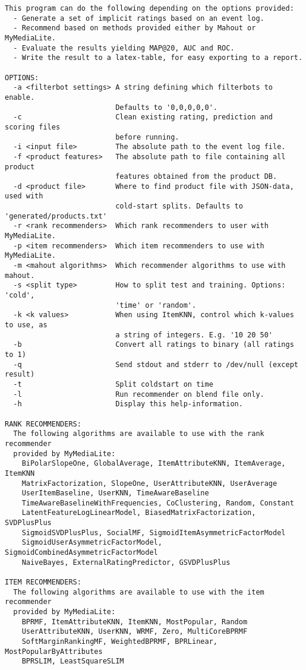 \begin{lstlisting}
This program can do the following depending on the options provided:
  - Generate a set of implicit ratings based on an event log.
  - Recommend based on methods provided either by Mahout or MyMediaLite.
  - Evaluate the results yielding MAP@20, AUC and ROC.
  - Write the result to a latex-table, for easy exporting to a report.

OPTIONS:
  -a <filterbot settings> A string defining which filterbots to enable.
                          Defaults to '0,0,0,0,0'.
  -c                      Clean existing rating, prediction and scoring files
                          before running.
  -i <input file>         The absolute path to the event log file.
  -f <product features>   The absolute path to file containing all product
                          features obtained from the product DB.
  -d <product file>       Where to find product file with JSON-data, used with
                          cold-start splits. Defaults to 'generated/products.txt'
  -r <rank recommenders>  Which rank recommenders to user with MyMediaLite.
  -p <item recommenders>  Which item recommenders to use with MyMediaLite.
  -m <mahout algorithms>  Which recommender algorithms to use with mahout.
  -s <split type>         How to split test and training. Options: 'cold',
                          'time' or 'random'.
  -k <k values>           When using ItemKNN, control which k-values to use, as
                          a string of integers. E.g. '10 20 50'
  -b                      Convert all ratings to binary (all ratings to 1)
  -q                      Send stdout and stderr to /dev/null (except result)
  -t                      Split coldstart on time
  -l                      Run recommender on blend file only.
  -h                      Display this help-information.

RANK RECOMMENDERS:
  The following algorithms are available to use with the rank recommender
  provided by MyMediaLite:
    BiPolarSlopeOne, GlobalAverage, ItemAttributeKNN, ItemAverage, ItemKNN
    MatrixFactorization, SlopeOne, UserAttributeKNN, UserAverage
    UserItemBaseline, UserKNN, TimeAwareBaseline
    TimeAwareBaselineWithFrequencies, CoClustering, Random, Constant
    LatentFeatureLogLinearModel, BiasedMatrixFactorization, SVDPlusPlus
    SigmoidSVDPlusPlus, SocialMF, SigmoidItemAsymmetricFactorModel
    SigmoidUserAsymmetricFactorModel, SigmoidCombinedAsymmetricFactorModel
    NaiveBayes, ExternalRatingPredictor, GSVDPlusPlus

ITEM RECOMMENDERS:
  The following algorithms are available to use with the item recommender
  provided by MyMediaLite:
    BPRMF, ItemAttributeKNN, ItemKNN, MostPopular, Random
    UserAttributeKNN, UserKNN, WRMF, Zero, MultiCoreBPRMF
    SoftMarginRankingMF, WeightedBPRMF, BPRLinear, MostPopularByAttributes
    BPRSLIM, LeastSquareSLIM


\end{lstlisting}
